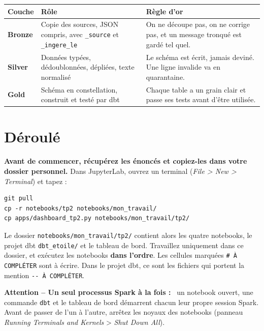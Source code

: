 \documentclass[11pt,a4paper]{article}
\newenvironment{attention}[1][]{\par\medskip\noindent\textbf{\textcolor{lhred}{Attention\if\relax\detokenize{#1}\relax\else{} -- #1\fi{} :}}\ }{\par\medskip}
\newcommand{\cmd}[1]{\texttt{#1}}
\newcommand{\nb}[1]{\textcolor{lhblue}{\texttt{#1}}}
\begin{document}
\begin{center}
\small
\renewcommand{\arraystretch}{1.3}
\begin{tabularx}{\textwidth}{@{}>{\bfseries}p{2.2cm} X X@{}}
\toprule
\normalfont\textbf{Couche} & \textbf{Rôle} & \textbf{Règle d'or} \\
\midrule
Bronze & Copie des sources, JSON compris, avec \cmd{\_source} et \cmd{\_ingere\_le} &
  On ne découpe pas, on ne corrige pas, et un message tronqué est gardé tel quel. \\
Silver & Données typées, dédoublonnées, dépliées, texte normalisé &
  Le schéma est écrit, jamais deviné. Une ligne invalide va en quarantaine. \\
Gold & Schéma en constellation, construit et testé par dbt &
  Chaque table a un grain clair et passe ses tests avant d'être utilisée. \\
\bottomrule
\end{tabularx}
\end{center}

\section{Déroulé}

\textbf{Avant de commencer, récupérez les énoncés et copiez-les dans votre dossier personnel.} Dans
JupyterLab, ouvrez un terminal (\emph{File > New > Terminal}) et tapez :
\begin{lstlisting}[style=shell]
git pull
cp -r notebooks/tp2 notebooks/mon_travail/
cp apps/dashboard_tp2.py notebooks/mon_travail/tp2/
\end{lstlisting}
Le dossier \nb{notebooks/mon\_travail/tp2/} contient alors les quatre notebooks, le projet dbt
\nb{dbt\_etoile/} et le tableau de bord. Travaillez uniquement dans ce dossier, et exécutez les
notebooks \textbf{dans l'ordre}. Les cellules marquées \cmd{\# À COMPLÉTER} sont à écrire. Dans le
projet dbt, ce sont les fichiers qui portent la mention \cmd{-{}- À COMPLÉTER}.

\begin{attention}[Un seul processus Spark à la fois]
un notebook ouvert, une commande \cmd{dbt} et le tableau
de bord démarrent chacun leur propre session Spark. Avant de passer de l'un à l'autre, arrêtez les
noyaux des notebooks (panneau \emph{Running Terminals and Kernels} > \emph{Shut Down All}).
\end{attention}
\end{document}
